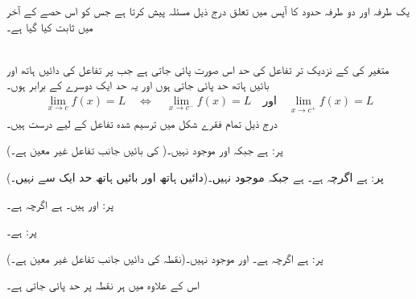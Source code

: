 یک طرفہ اور دو طرفہ حدود   کا  آپس میں تعلق درج ذیل مسئلہ پیش کرتا ہے جس کو اس حصے کے آخر میں ثابت  کیا گیا ہے۔

\\
متغیر  کی  کے نزدیک تر تفاعل  کی حد اس صورت پائی جاتی ہے جب    پر تفاعل کی  دائیں ہاتھ اور بائیں ہاتھ حد پائی  جاتی ہوں اور یہ حد ایک دوسرے کے برابر ہوں۔
\begin{align*}
\lim_{x\to c} f(x)=L\quad \Leftrightarrow\quad \lim_{x\to c^-} f(x)=L \quad \text{اور}\quad \lim_{x\to c^+}f(x)=L
\end{align*} 
درج ذیل تمام فقرے شکل  میں ترسیم شدہ تفاعل کے لیے درست ہیں۔
\begin{description}
\item{ پر:}
 ہے جبکہ   اور  موجود نہیں۔( کی بائیں جانب تفاعل غیر معین ہے۔)
\item{ پر:}
 ہے اگرچہ  ہے۔ ہے جبکہ  موجود نہیں۔(دائیں ہاتھ اور بائیں ہاتھ حد ایک سے نہیں۔)
\item{ پر:}
 اور   ہیں۔ ہے اگرچہ  ہے۔
\item{ پر:}
 ہے۔
\item{ پر:}
 ہے اگرچہ  ہے۔ اور  موجود نہیں۔(نقطہ  کی  دائیں جانب تفاعل غیر معین ہے۔)
\end{description}
اس کے علاوہ  میں ہر نقطہ  پر  حد  پائی جاتی ہے۔
%
